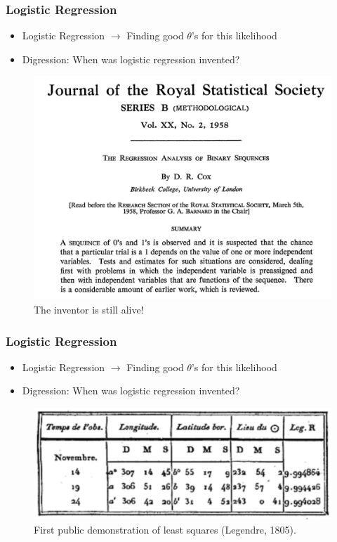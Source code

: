 \documentclass[10pt,mathserif]{beamer}
\begin{document}
\begin{frame}
  \frametitle{Logistic Regression}
  \begin{itemize}
  \item Logistic Regression $\rightarrow$ Finding good $\theta$'s for this
    likelihood
  \item Digression: When was logistic regression invented?
  \end{itemize}
  \begin{figure}[ht]
    \centering
    \includegraphics[width=0.4\paperwidth]{figure/logistic_paper}
    \caption{The inventor is still alive! \label{fig:logistic_paper} }
  \end{figure}
\end{frame}

\begin{frame}
  \frametitle{Logistic Regression}
  \begin{itemize}
  \item Logistic Regression $\rightarrow$ Finding good $\theta$'s for this
    likelihood
  \item Digression: When was logistic regression invented?
  \end{itemize}
  \begin{figure}[ht]
    \centering
    \includegraphics[width=0.7\paperwidth]{figure/least_squares}
    \caption{First public demonstration of least squares (Legendre,
      1805). \label{fig:least_squares} }
  \end{figure}
\end{frame}
\end{document}
